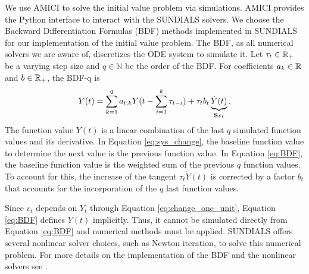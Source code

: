 We use AMICI \citep{Frohlich.2021} to solve the initial value problem via simulations. AMICI provides the Python interface to interact with the SUNDIALS \citep{Hindmarsh.2005} solvers. We choose the Backward Differentiation Formulas (BDF) methods implemented in SUNDIALS for our implementation  of the initial value problem. The BDF, as all numerical solvers we are aware of, discretizes the ODE system to simulate it. Let $\tau_t \in \mathbb{R}_+$ be a varying step size and $q \in \mathbb{N}$ be the order of the BDF. For coefficients $a_k\in \mathbb{R}$ and $b \in \mathbb{R}_+$, the BDF-q is  
\begin{align}
\label{eq:BDF}
Y(t) = \sum_{k=1}^q a_{t,k} Y(t - \sum_{i=1}^k \tau_{t-i} ) + \tau_t b_t \underbrace{\dot{Y}(t)}_{\mathbf{S} v_t}.
\end{align}
The function value $Y(t)$ is a linear combination of the last $q$ simulated function values and its derivative. In Equation \eqref{eq:sys_change}, the baseline function value to determine the next value is the previous function value. In Equation \eqref{eq:BDF}, the baseline function value is the weighted sum of the previous $q$ function values. To account for this, the increase of the tangent $\tau_t \dot{Y}(t)$ is corrected by a factor $b_t$ that accounts for the incorporation of the $q$ last function values.

Since $v_t$ depends on $Y_t$ through Equation \eqref{eq:change_one_unit}, Equation \eqref{eq:BDF} defines $Y(t)$ implicitly. Thus, it cannot be simulated directly from Equation \eqref{eq:BDF} and numerical methods must be applied. SUNDIALS offers several nonlinear solver choices, such as Newton iteration, to solve this numerical problem. For more details on the implementation of the BDF and the nonlinear solvers see \cite{Hindmarsh.2019}.
 
